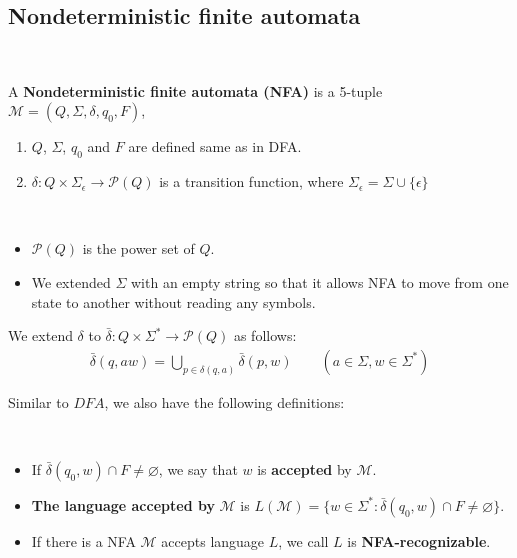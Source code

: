 \newpage
\subsection{Nondeterministic finite automata} \label{sec:}
\begin{definition} ~
    
    A \textbf{Nondeterministic finite automata (NFA)} is a 5-tuple $\mathcal{M} = (Q, \Sigma, \delta, q_0, F)$,
    \begin{enumerate}
        \item $Q$, $\Sigma$, $q_0$ and $F$ are defined same as in DFA.
        \item $\delta: Q \times \Sigma_\epsilon \to \mathcal{P}(Q)$ is a transition function, where $\Sigma_\epsilon = \Sigma \cup \{ \epsilon \}$
    \end{enumerate}
\end{definition}
\begin{remark} ~
    \begin{itemize}
        \item $\mathcal{P}(Q)$ is the power set of $Q$.
        \item We extended $\Sigma$ with an empty string so that it allows NFA to move from one state to another without reading any symbols.
    \end{itemize}
\end{remark}

\begin{definition}
    We extend $\delta$ to $\bar{\delta}: Q \times \Sigma^{*} \to \mathcal{P}(Q)$ as follows:
    \begin{align*}
        \bar{\delta}(q,aw) = \bigcup_{p \in \delta(q,a)} \bar{\delta}(p,w) \qquad (a \in \Sigma, w \in \Sigma^{*})
    \end{align*}
\end{definition}

Similar to $DFA$, we also have the following definitions:
\begin{definition} ~
    \begin{itemize}
        \item If $\bar{\delta}(q_0,w)\cap F \neq \varnothing$, we say that $w$ is \textbf{accepted} by $\mathcal{M}$.
        \item \textbf{The language accepted by} $\mathcal{M}$ is $L(\mathcal{M}) = \{ w \in \Sigma^{*} : \bar{\delta}(q_0,w) \cap F \neq \varnothing \}$.
        \item If there is a NFA $\mathcal{M}$ accepts language $L$, we call $L$ is \textbf{NFA-recognizable}.
    \end{itemize}
\end{definition}

